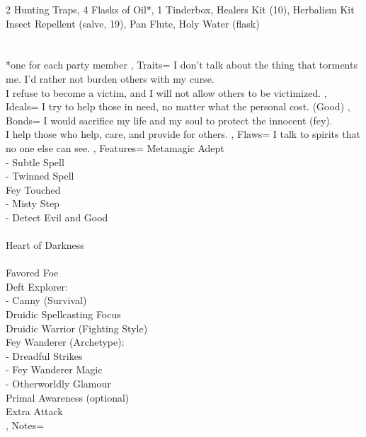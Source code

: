 \documentclass[10pt,a4paper]{scrbook}
\begin{document}
{{			2 Hunting Traps, 4 Flasks of Oil*, 1 Tinderbox, Healers Kit (10), Herbalism Kit\\
			Insect Repellent (salve, 19), Pan Flute, Holy Water (flask)\\
			\\
			\\
			*one for each party member
		},
		Traits={\tiny
			I don't talk about the thing that torments me. I'd rather not burden others with my curse.\\
			I refuse to become a victim, and I will not allow others to be victimized.
		},
		Ideals={
			I try to help those in need, no matter what the personal cost. (Good)
		},
		Bonds={
			\tiny
			I would sacrifice my life and my soul to protect the innocent (fey).\\
			I help those who help, care, and provide for others.
		},
		Flaws={
			I talk to spirits that no one else can see.
		},
		Features={
			Metamagic Adept\\
			- Subtle Spell\\
			- Twinned Spell\\
			Fey Touched\\
			- Misty Step\\
			- Detect Evil and Good\\
			\\
			Heart of Darkness\\
			\\
			Favored Foe\\ %
			Deft Explorer:\\ %
			- Canny (Survival)\\
			Druidic Spellcasting Focus\\
			Druidic Warrior (Fighting Style)\\
			Fey Wanderer (Archetype):\\
			- Dreadful Strikes\\
			- Fey Wanderer Magic\\
			- Otherworldly Glamour\\
			Primal Awareness (optional)\\
			Extra Attack\\
		},
		Notes={
		}
	}
\end{document}
